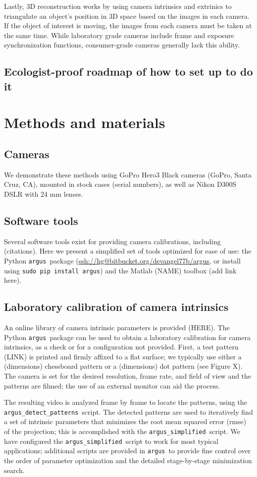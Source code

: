 \documentclass[fleqn,10pt]{wlpeerj}
\makeatletter
\newcommand{\argus}{\texttt{argus}}
\newcommand{\detectpatterns}{\texttt{argus\_detect\_patterns}}
\newcommand{\simplified}{\texttt{argus\_simplified}}
\newcommand{\pipcommand}{\texttt{sudo pip install argus}}
\newcommand{\argusrepo}{\url{ssh://hg@bitbucket.org/devangel77b/argus}}
\newcommand{\matlabtoolbox}{add link here}
\makeatother
\begin{document}
Lastly, 3D reconstruction works by using camera intrinsics and extrinics to triangulate an object's position in 3D space based on the images in each camera.  If the object of interest is moving, the images from each camera must be taken at the same time. While laboratory grade cameras include frame and exposure synchronization functions, consumer-grade cameras generally lack this ability.  
\subsection*{Ecologist-proof roadmap of how to set up to do it}

\section*{Methods and materials}
\subsection*{Cameras}
We demonstrate these methods using GoPro Hero3 Black cameras (GoPro, Santa Cruz, CA), mounted in stock cases (serial numbers), as well as Nikon D300S DSLR with 24 mm lenses. 

\subsection*{Software tools}
Several software tools exist for providing camera calibrations, including (citations).  Here we present a simplified set of tools optimized for ease of use: the Python \argus\ package (\argusrepo, or install using \pipcommand) and the Matlab (NAME) toolbox (\matlabtoolbox). 

\subsection*{Laboratory calibration of camera intrinsics}
An online library of camera intrinsic parameters is provided (HERE).  The Python \argus\ package can be used to obtain a laboratory calibration for camera intrinsics, as a check or for a configuration not provided. First, a test pattern (LINK) is printed and firmly affixed to a flat surface; we typically use either a (dimensions) chessboard pattern or a (dimensions) dot pattern (see Figure X).  The camera is set for the desired resolution, frame rate, and field of view and the patterns are filmed; the use of an external monitor can aid the process.  

The resulting video is analyzed frame by frame to locate the patterns, using the \detectpatterns\ script.  The detected patterns are used to iteratively find a set of intrinsic parameters that minimizes the root mean squared error (rmse) of the projection; this is accomplished with the \simplified\ script.  We have configured the \simplified\ script to work for most typical applications; additional scripts are provided in \argus\ to provide fine control over the order of parameter optimization and the detailed stage-by-stage minimization search.
\end{document}

